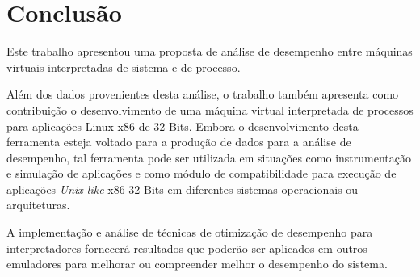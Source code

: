 \documentclass[11pt,twoside]{article}
\begin{document}
\section{Conclusão}  \label{sec:conclusao}

Este trabalho apresentou uma proposta de análise de desempenho entre máquinas 
virtuais interpretadas de sistema e de processo.

Além dos dados provenientes desta análise, o trabalho também apresenta como 
contribuição o desenvolvimento de uma máquina virtual interpretada de processos para 
aplicações Linux x86 de 32 Bits. Embora o desenvolvimento desta ferramenta esteja 
voltado para a produção de dados para a análise de desempenho, tal ferramenta 
pode ser utilizada em situações como instrumentação e simulação de aplicações 
e como módulo de compatibilidade para execução de aplicações \textit{Unix-like} x86 
32 Bits em diferentes sistemas operacionais ou arquiteturas.

A implementação e análise de técnicas de otimização de desempenho para 
interpretadores fornecerá resultados que poderão ser aplicados em outros 
emuladores para melhorar ou compreender melhor o desempenho do sistema. 






\end{document}
